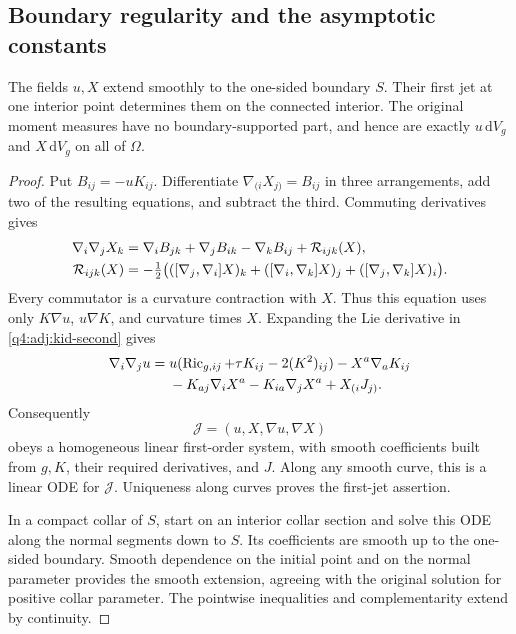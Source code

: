 \subsection{Boundary regularity and the asymptotic constants}

\begin{lemma}
\label{q4:adj:boundary-regularity}
The fields $u,X$ extend smoothly to the one-sided boundary $S$.  Their first
jet at one interior point determines them on the connected interior.
The original moment measures have no boundary-supported part, and hence are
exactly $u\,\mathrm dV_g$ and $X\,\mathrm dV_g$ on all of $\Omega$.
\end{lemma}

\begin{proof}
Put $B_{ij}=-uK_{ij}$.  Differentiate
$\nabla_{(i}X_{j)}=B_{ij}$ in three arrangements, add two of the resulting
equations, and subtract the third.  Commuting derivatives gives
\begin{align}
 \nabla_i\nabla_jX_k
 &=\nabla_iB_{jk}+\nabla_jB_{ik}-\nabla_kB_{ij}
       +\mathcal R_{ijk}(X),\label{q4:adj:prolongation-x}\\
 \mathcal R_{ijk}(X)
 &=-\tfrac12\bigl(
       ([\nabla_j,\nabla_i]X)_k
       +([\nabla_i,\nabla_k]X)_j
       +([\nabla_j,\nabla_k]X)_i\bigr).\notag
\end{align}
Every commutator is a curvature contraction with $X$.  Thus this equation
uses only $K\nabla u$, $u\nabla K$, and curvature times $X$.
Expanding the Lie derivative in \eqref{q4:adj:kid-second} gives
\begin{align}
 \nabla_i\nabla_ju
 ={}&u(\operatorname{Ric}_{g,ij}+\tau K_{ij}-2(K^2)_{ij})-X^a\nabla_aK_{ij}
       \notag\\
 &-K_{aj}\nabla_iX^a-K_{ia}\nabla_jX^a+X_{(i}J_{j)}.
 \label{q4:adj:prolongation-u}
\end{align}
Consequently
\[
 \mathcal J=(u,X,\nabla u,\nabla X)
\]
obeys a homogeneous linear first-order system, with smooth coefficients
built from $g,K$, their required derivatives, and $J$.  Along any smooth
curve, this is a linear ODE for $\mathcal J$.  Uniqueness along curves proves
the first-jet assertion.

In a compact collar of $S$, start on an interior collar section and solve
this ODE along the normal segments down to $S$.  Its coefficients are smooth
up to the one-sided boundary.  Smooth dependence on the initial point and on
the normal parameter provides the smooth extension, agreeing with the
original solution for positive collar parameter.  The pointwise inequalities
and complementarity extend by continuity.


\end{proof}
